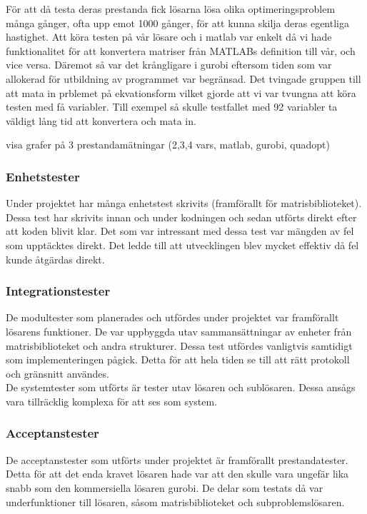 	För att då testa deras prestanda fick lösarna lösa olika optimeringsproblem många gånger, ofta upp emot 1000 gånger, för att kunna skilja deras egentliga hastighet. Att köra testen på vår lösare och i matlab var enkelt då vi hade funktionalitet för att konvertera matriser från MATLABs definition till vår, och vice versa. Däremot så var det krångligare i gurobi eftersom tiden som var allokerad för utbildning av programmet var begränsad. Det tvingade gruppen till att mata in prblemet på ekvationsform vilket gjorde att vi var tvungna att köra testen med få variabler. Till exempel så skulle testfallet med 92 variabler ta väldigt lång tid att konvertera och mata in. \newline

	visa grafer på 3 prestandamätningar (2,3,4 vars, matlab, gurobi, quadopt) 	
	
	\subsubsection{Enhetstester}
	Under projektet har många enhetstest skrivits (framförallt för matrisbiblioteket). Dessa test har skrivits innan och under kodningen och sedan utförts direkt efter att koden blivit klar. Det som var intressant med dessa test var mängden av fel som upptäcktes direkt. Det ledde till att utvecklingen blev mycket effektiv då fel kunde åtgärdas direkt.
	
	\subsubsection{Integrationstester}
	De modultester som planerades och utfördes under projektet var framförallt lösarens funktioner. De var uppbyggda utav sammansättningar av enheter från matrisbiblioteket och andra strukturer. Dessa test utfördes vanligtvis samtidigt som implementeringen pågick. Detta för att hela tiden se till att rätt protokoll och gränsnitt användes.\\
De systemtester som utförts är tester utav lösaren och sublösaren. Dessa ansågs vara tillräcklig komplexa för att ses som system. 
	
	
	\subsubsection{Acceptanstester}
	De acceptanstester som utförts under projektet är framförallt prestandatester. Detta för att det enda kravet lösaren hade var att den skulle vara ungefär lika snabb som den kommersiella lösaren gurobi. De delar som testats då var underfunktioner till lösaren, såsom matrisbiblioteket och subproblemslösaren.
	
